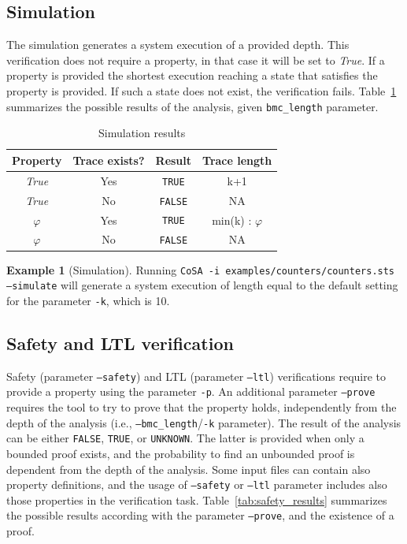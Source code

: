 \documentclass{article}
\theoremstyle{definition}
\newtheorem{example}{Example}[section]
\begin{document}
\subsection{Simulation}
The simulation generates a system execution of a provided depth. This
verification does not require a property, in that case it will be set
to \emph{True}. If a property is provided the shortest execution
reaching a state that satisfies the property is provided. If such a
state does not exist, the verification
fails. Table~\ref{tab:simulation_results} summarizes the possible
results of the analysis, given \texttt{bmc\_length} parameter.

\begin{table}[h]
  \centering
\begin{tabular}{ c c | c c }
  Property & Trace exists? & Result & Trace length \\ \hline 
  \emph{True} & Yes & \texttt{TRUE} & k+1  \\
  \emph{True} & No & \texttt{FALSE} & NA  \\
  $\varphi$ & Yes & \texttt{TRUE} & min(k) : $\varphi$  \\
  $\varphi$ & No & \texttt{FALSE} & NA  \\
\end{tabular}
\caption{Simulation results}
\label{tab:simulation_results}
\end{table}

\begin{example}[Simulation]
  Running \texttt{CoSA -i examples/counters/counters.sts --simulate}
  will generate a system execution of length equal to the default
  setting for the parameter \texttt{-k}, which is 10.
\end{example}

\subsection{Safety and LTL verification}
\label{sec:safety_and_ltl}

Safety (parameter \texttt{--safety}) and LTL (parameter
\texttt{--ltl}) verifications require to provide a property using the
parameter \texttt{-p}. An additional parameter \texttt{--prove}
requires the tool to try to prove that the property holds,
independently from the depth of the analysis (i.e.,
\texttt{--bmc\_length}/\texttt{-k} parameter). The result of the
analysis can be either \texttt{FALSE}, \texttt{TRUE}, or
\texttt{UNKNOWN}. The latter is provided when only a bounded proof
exists, and the probability to find an unbounded proof is dependent
from the depth of the analysis. Some input files can contain also
property definitions, and the usage of \texttt{--safety} or
\texttt{--ltl} parameter includes also those properties in the
verification task.  Table~\ref{tab:safety_results} summarizes the
possible results according with the parameter \texttt{--prove}, and
the existence of a proof.
\end{document}
